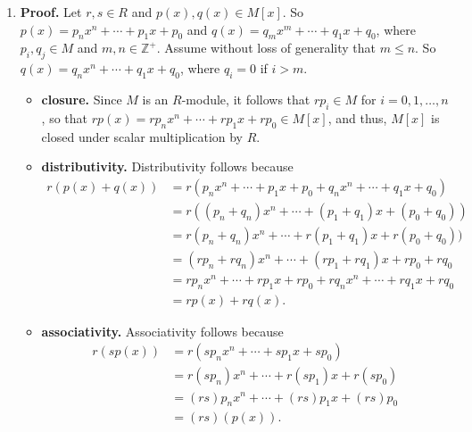 \documentclass[9pt]{article}
\newcommand{\Z}{\mathbb{Z}}
\begin{document}
\begin{enumerate}
      \begin{enumerate}
         \item \textbf{Proof.} Let $r, s \in R$ and $p(x), q(x) \in M[x]$. So
               $p(x) = p_nx^n + \cdots + p_1x + p_0$ and
               $q(x) = q_mx^m + \cdots + q_1x + q_0$, where $p_i, q_j \in M$ and
               $m, n \in \Z^+$. Assume without loss of generality that
               $m \le n$. So $q(x) = q_nx^n + \cdots + q_1x + q_0$, where
               $q_i = 0$ if $i > m$.
               \begin{itemize}
                  \item \textbf{closure.} Since $M$ is an $R$-module, it follows
                        that $rp_i \in M$ for $i = 0, 1, \ldots, n$, so that
                        $rp(x) = rp_nx^n + \cdots + rp_1x + rp_0 \in M[x]$, and
                        thus, $M[x]$ is closed under scalar multiplication by
                        $R$.
                  \item \textbf{distributivity.} Distributivity follows because
                        \begin{align*}
                           r(p(x) + q(x)) &= r(p_nx^n + \cdots + p_1x + p_0 +
                              q_nx^n + \cdots + q_1x + q_0) \\
                              &= r((p_n+q_n)x^n + \cdots + (p_1+q_1)x + (p_0+q_0)) \\
                              &= r(p_n+q_n)x^n + \cdots + r(p_1+q_1)x + r(p_0+q_0)) \\
                              &= (rp_n+rq_n)x^n + \cdots + (rp_1+rq_1)x + rp_0+rq_0 \\
                              &= rp_nx^n + \cdots + rp_1x + rp_0+rq_nx^n + \cdots + rq_1x + rq_0 \\
                              &= rp(x) + rq(x).
                        \end{align*}
                  \item \textbf{associativity.} Associativity follows because
                        \begin{align*}
                           r(sp(x)) &= r(sp_nx^n + \cdots + sp_1x + sp_0) \\
                              &= r(sp_n)x^n + \cdots + r(sp_1)x + r(sp_0) \\
                              &= (rs)p_nx^n + \cdots + (rs)p_1x + (rs)p_0 \\
                              &= (rs)(p(x)).
                        \end{align*}

\end{itemize}
\end{enumerate}
\end{enumerate}
\end{document}
